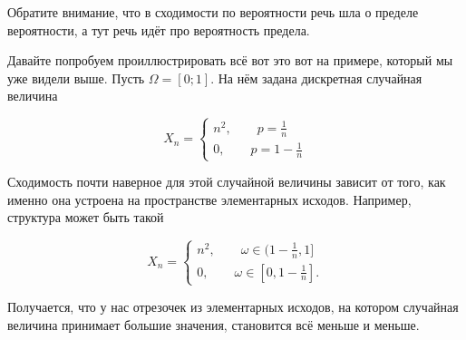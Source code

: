 \documentclass[12pt, a4paper, oneside]{article}
\begin{document}
Обратите внимание, что в сходимости по вероятности речь шла о пределе вероятности, а тут речь идёт про вероятность предела. 

Давайте попробуем проиллюстрировать всё вот это вот на примере, который мы уже видели выше. Пусть $\Omega = [0;1]$. На нём задана дискретная случайная величина

$$
X_n = \begin{cases} n^2, \qquad p = \frac{1}{n} \\ 0, \qquad p = 1 - \frac{1}{n} \end{cases} 
$$

Сходимость почти наверное для этой случайной величины зависит от того, как именно она устроена на пространстве элементарных исходов. Например, структура может быть такой

$$
X_n = \begin{cases} n^2, \qquad \omega \in (1-\frac{1}{n}, 1] \\ 0, \qquad \omega \in [0, 1 - \frac{1}{n}]. \end{cases} 
$$

Получается, что у нас отрезочек из элементарных исходов, на котором случайная величина принимает большие значения, становится всё меньше и меньше.
\end{document}
